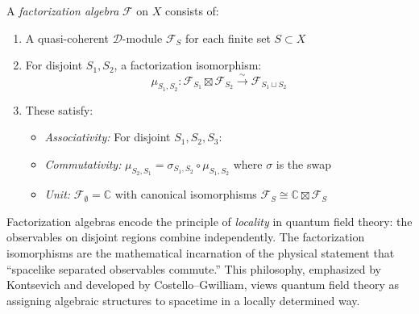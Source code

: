 \begin{definition}\label{def:fact-algebra-correct}
A \emph{factorization algebra} $\mathcal{F}$ on $X$ consists of:
\begin{enumerate}
\item A quasi-coherent $\mathcal{D}$-module $\mathcal{F}_S$ for each finite set $S \subset X$
\item For disjoint $S_1, S_2$, a factorization isomorphism:
   \[\mu_{S_1,S_2}: \mathcal{F}_{S_1} \boxtimes \mathcal{F}_{S_2} \xrightarrow{\sim} \mathcal{F}_{S_1 \sqcup S_2}\]
\item These satisfy:
   \begin{itemize}
   \item \emph{Associativity:} For disjoint $S_1, S_2, S_3$:
   \begin{center}
   \end{center}
   \item \emph{Commutativity:} $\mu_{S_2,S_1} = \sigma_{S_1,S_2} \circ \mu_{S_1,S_2}$ where $\sigma$ is the swap
   \item \emph{Unit:} $\mathcal{F}_\emptyset = \mathbb{C}$ with canonical isomorphisms $\mathcal{F}_S \cong \mathbb{C} \boxtimes \mathcal{F}_S$
   \end{itemize}
\end{enumerate}
\end{definition}

\begin{remark}
Factorization algebras encode the principle of \emph{locality} in quantum field theory: the observables 
on disjoint regions combine independently. The factorization isomorphisms are the mathematical incarnation 
of the physical statement that ``spacelike separated observables commute.'' This philosophy, emphasized by 
Kontsevich and developed by Costello--Gwilliam, views quantum field theory as assigning algebraic structures 
to spacetime in a locally determined way.
\end{remark}

